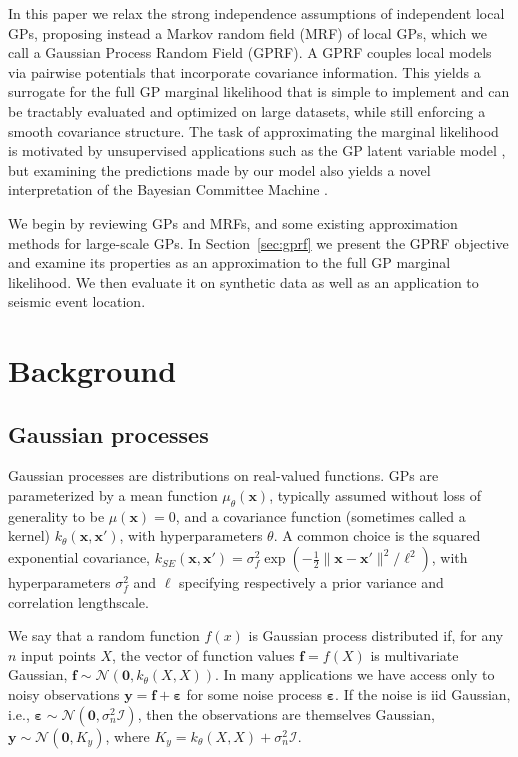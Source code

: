 \documentclass{article}
\newcommand{\N}{\mathcal{N}}
\newcommand{\I}{\mathcal{I}}
\newcommand{\eps}{\varepsilon}
\renewcommand{\v}[1]{\mathbf{#1}}
\begin{document}
In this paper we relax the strong independence assumptions of
independent local GPs, proposing instead a Markov random field (MRF) of
local GPs, which we call a Gaussian Process Random Field (GPRF). A
GPRF couples local models via pairwise potentials that incorporate
covariance information. This yields a surrogate for the full GP
marginal likelihood that is simple to implement and 
can be tractably evaluated and optimized on
large datasets, while still enforcing a smooth covariance
structure. The task of approximating the marginal likelihood is
motivated by unsupervised applications such as the GP latent variable
model \cite{lawrence2004gaussian}, but examining the predictions made by our model also
yields a novel interpretation of the Bayesian Committee Machine \cite{tresp2000bayesian}.

We begin by reviewing GPs and MRFs, and
some existing approximation methods for large-scale GPs. In
Section~\ref{sec:gprf} we present the GPRF objective and examine its
properties as an approximation to the full GP marginal likelihood.  We
then evaluate it on synthetic data as well as an application to seismic event location. 
\vspace{-0.2cm}
\section{Background}
\vspace{-0.2cm}
\subsection{Gaussian processes}
\vspace{-0.2cm}
Gaussian processes \citep{rasmussen2006} are
distributions on real-valued functions. GPs are
parameterized by a mean function $\mu_\theta(\v{x})$, typically assumed
without loss of generality to be $\mu(\v{x})=0$, and a covariance function (sometimes called a kernel)
$k_\theta(\v{x}, \v{x}')$,  with hyperparameters $\theta$. A common choice is the squared
exponential covariance, $k_{SE}(\v{x}, \v{x}') =
\sigma^2_f\exp\left(-\frac{1}{2}\|\v{x}-\v{x}'\|^2 / \ell^2\right)$, with
hyperparameters $\sigma^2_f$  and $\ell$ specifying respectively a
prior variance and correlation lengthscale. 

We say that a random function $f(x)$ is Gaussian process distributed if, for
any $n$ input points $X$, the vector of function values $\v{f} = f(X)$ is
multivariate Gaussian, $\v{f} \sim \N(\v{0}, k_\theta(X, X)).$ In many applications we
have access only to noisy observations $\v{y} = \v{f} + \v{\eps}$ for some
noise process $\v{\eps}$. If the noise is iid Gaussian, i.e., $\v{\eps}\sim
\N(\v{0}, \sigma_n^2 \I)$, then the observations are themselves Gaussian, $\v{y} \sim \N(\v{0}, K_y)$, where $K_y = k_\theta(X, X) + \sigma^2_n\I.$
\end{document}
